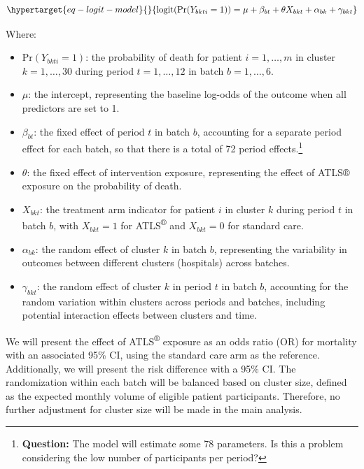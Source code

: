 \documentclass[
]{scrartcl}
\providecommand{\tightlist}{%
  \setlength{\itemsep}{0pt}\setlength{\parskip}{0pt}}\usepackage{longtable,booktabs,array}
\begin{document}
\begin{equation}\protect\hypertarget{eq-logit-model}{}{
\text{logit}(\text{Pr}(Y_{bkti} = 1)) = \mu + \beta_{bt} + \theta X_{bkt} + \alpha_{bk} + \gamma_{bkt} 
}\label{eq-logit-model}\end{equation}

Where:

\begin{itemize}
\tightlist
\item
  \(\text{Pr}(Y_{bkti} = 1)\): the probability of death for patient
  \(i = 1, \dotsc,m\) in cluster \(k = 1, \dotsc, 30\) during period
  \(t = 1, \dotsc, 12\) in batch \(b = 1, \dotsc, 6\).
\item
  \(\mu\): the intercept, representing the baseline log-odds of the
  outcome when all predictors are set to 1.
\item
  \(\beta_{bt}\): the fixed effect of period \(t\) in batch \(b\),
  accounting for a separate period effect for each batch, so that there
  is a total of 72 period effects.\footnote{\textbf{Question:} The model
    will estimate some 78 parameters. Is this a problem considering the
    low number of participants per period?}
\item
  \(\theta\): the fixed effect of intervention exposure, representing
  the effect of ATLS® exposure on the probability of death.
\item
  \(X_{bkt}\): the treatment arm indicator for patient \(i\) in cluster
  \(k\) during period \(t\) in batch \(b\), with \(X_{bkt} = 1\) for
  ATLS\textsuperscript{®} and \(X_{bkt} = 0\) for standard care.
\item
  \(\alpha_{bk}\): the random effect of cluster \(k\) in batch \(b\),
  representing the variability in outcomes between different clusters
  (hospitals) across batches.
\item
  \(\gamma_{bkt}\): the random effect of cluster \(k\) in period \(t\)
  in batch \(b\), accounting for the random variation within clusters
  across periods and batches, including potential interaction effects
  between clusters and time.
\end{itemize}

We will present the effect of ATLS\textsuperscript{®} exposure as an
odds ratio (OR) for mortality with an associated 95\% CI, using the
standard care arm as the reference. Additionally, we will present the
risk difference with a 95\% CI. The randomization within each batch will
be balanced based on cluster size, defined as the expected monthly
volume of eligible patient participants. Therefore, no further
adjustment for cluster size will be made in the main analysis.
\end{document}
